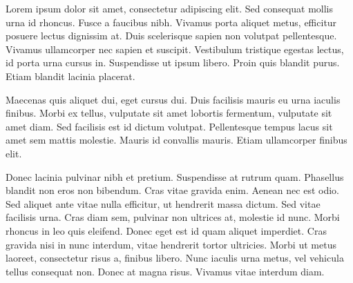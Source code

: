 \begin{flushleft}
Lorem ipsum dolor sit amet, consectetur adipiscing elit. Sed consequat mollis urna id rhoncus. Fusce a faucibus nibh. Vivamus porta aliquet metus, efficitur posuere lectus dignissim at. Duis scelerisque sapien non volutpat pellentesque. Vivamus ullamcorper nec sapien et suscipit. Vestibulum tristique egestas lectus, id porta urna cursus in. Suspendisse ut ipsum libero. Proin quis blandit purus. Etiam blandit lacinia placerat.

Maecenas quis aliquet dui, eget cursus dui. Duis facilisis mauris eu urna iaculis finibus. Morbi ex tellus, vulputate sit amet lobortis fermentum, vulputate sit amet diam. Sed facilisis est id dictum volutpat. Pellentesque tempus lacus sit amet sem mattis molestie. Mauris id convallis mauris. Etiam ullamcorper finibus elit.

Donec lacinia pulvinar nibh et pretium. Suspendisse at rutrum quam. Phasellus blandit non eros non bibendum. Cras vitae gravida enim. Aenean nec est odio. Sed aliquet ante vitae nulla efficitur, ut hendrerit massa dictum. Sed vitae facilisis urna. Cras diam sem, pulvinar non ultrices at, molestie id nunc. Morbi rhoncus in leo quis eleifend. Donec eget est id quam aliquet imperdiet. Cras gravida nisi in nunc interdum, vitae hendrerit tortor ultricies. Morbi ut metus laoreet, consectetur risus a, finibus libero. Nunc iaculis urna metus, vel vehicula tellus consequat non. Donec at magna risus. Vivamus vitae interdum diam.

\end{flushleft}
\vspace*{\fill}
